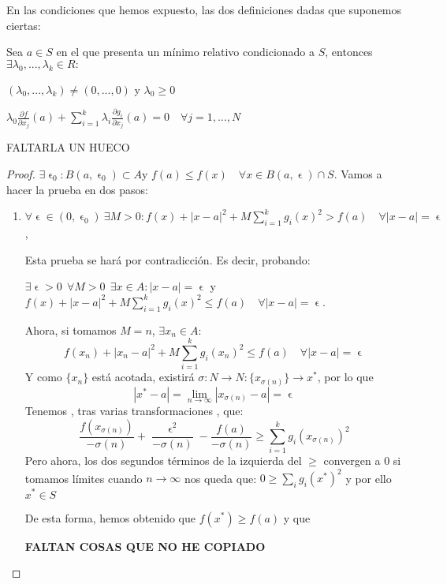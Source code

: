 \begin{nth}
	En las condiciones que hemos expuesto, las dos definiciones dadas que suponemos ciertas:

	Sea $a\in S$ en el que presenta un mínimo relativo condicionado a $S$, entonces $\exists \lambda_0,...,\lambda_k \in R:$
	\begin{nlist}
	\item $(\lambda_0,...,\lambda_k) \ne (0,...,0)$ y $\lambda_0 \geq 0$
	\item  $\lambda_0\frac{\partial f}{\partial x_j}(a)+\sum_{i=1}^k \lambda_i \frac{\partial g_i}{\partial x_j}(a) = 0 \quad \forall j=1,...,N$
\end{nlist}

FALTARLA UN HUECO
\end{nth}
\begin{proof}
	$\exists \upvarepsilon_0 : B(a,\upvarepsilon_0)\subset A $y $f(a) \leq f(x) \quad \forall x \in B(a,\upvarepsilon)\cap S$.
	Vamos a hacer la prueba en dos pasos:
	\begin{enumerate}
	\item $\forall \upvarepsilon \in (0,\upvarepsilon_0) \ \exists M > 0 : f(x) + |x-a|^2 + M \sum_{i=1}^kg_i(x)^2 > f(a) \quad \forall |x-a|= \upvarepsilon$,

	Esta prueba se hará por contradicción. Es decir, probando:

	$\exists \upvarepsilon > 0 \ \ \forall M> 0 \ \ \exists x\in A: |x-a|=\upvarepsilon$ y $f(x) + |x-a|^2 + M \sum_{i=1}^kg_i(x)^2 \leq f(a) \quad \forall |x-a|= \upvarepsilon$.

	Ahora, si tomamos $M=n$, $\exists x_n \in A:$
	\[
	f(x_n) + |x_n-a|^2 + M \sum_{i=1}^kg_i(x_n)^2 \leq f(a) \quad \forall |x-a|= \upvarepsilon
	\]
	Y como $\{x_n\}$ está acotada, existirá $\sigma :N \to N: \{x_{\sigma(n)}\}\to x^{*}$, por lo que
	\[
	|x^{*}-a|= \lim_{n\to \infty}|x_{\sigma(n)}-a| = \upvarepsilon
	\]
	Tenemos , tras varias transformaciones , que:
	\[
	\frac{f(x_{\sigma(n)})}{-\sigma(n)}+\frac{\upvarepsilon^2}{-\sigma(n)}-\frac{f(a)}{-\sigma(n)} \geq \sum_{i=1}^k g_i(x_{\sigma(n)})^2
	\]
	Pero ahora, los dos segundos términos de la izquierda del $\geq$ convergen a 0 si tomamos límites cuando $n\to \infty$ nos queda que:
	$0 \geq \sum_i g_i (x^*)^2$ y por ello $x^* \in S$

	De esta forma, hemos obtenido que $f(x^*) \geq f(a)$ y que

	\textbf{FALTAN COSAS QUE NO HE COPIADO}



\end{enumerate}
\end{proof}
